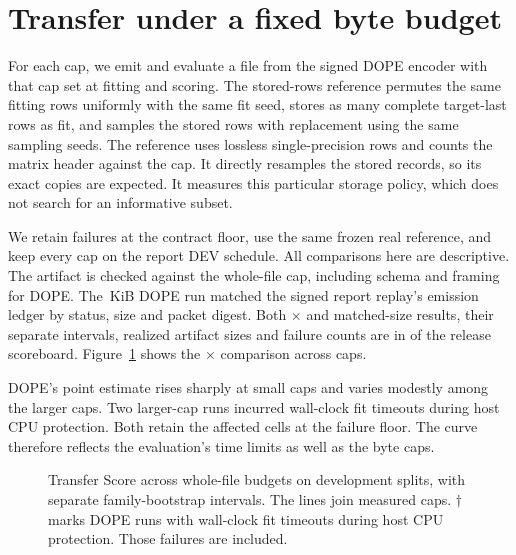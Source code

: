 \section{Transfer under a fixed byte budget}\label{app:budget}

For each cap, we emit and evaluate a file from the signed DOPE encoder with that cap set at fitting and scoring. The stored-rows reference permutes the same fitting rows uniformly with the same fit seed, stores as many complete target-last rows as fit, and samples the stored rows with replacement using the same sampling seeds. The reference uses lossless single-precision rows and counts the matrix header against the cap. It directly resamples the stored records, so its exact copies are expected. It measures this particular storage policy, which does not search for an informative subset.

We retain failures at the contract floor, use the same frozen real reference, and keep every cap on the report DEV schedule. All comparisons here are descriptive. The artifact is checked against the whole-file cap, including schema and framing for DOPE. The \,KiB DOPE run matched the signed report replay's emission ledger by status, size and packet digest. Both $\times$ and matched-size results, their separate intervals, realized artifact sizes and failure counts are in  of the release scoreboard. Figure~\ref{fig:budget} shows the $\times$ comparison across caps.

DOPE's point estimate rises sharply at small caps and varies modestly among the larger caps. Two larger-cap runs incurred wall-clock fit timeouts during host CPU protection. Both retain the affected cells at the failure floor. The curve therefore reflects the evaluation's time limits as well as the byte caps.

\begin{figure}[!htbp]
  \centering
  
  \caption{Transfer Score across whole-file budgets on development splits, with separate  family-bootstrap intervals. The lines join measured caps. $\dagger$ marks DOPE runs with wall-clock fit timeouts during host CPU protection. Those failures are included.}
  \label{fig:budget}
\end{figure}
